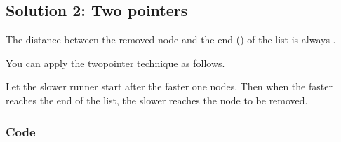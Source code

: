 \documentclass[letterpaper,12pt,english]{book}
\begin{document}
\subsection{Solution 2: Two pointers}
\label{\detokenize{Two_Pointers/08_TP_19_Remove_Nth_Node_From_End_of_List:solution-2-two-pointers}}
\sphinxAtStartPar
The distance between the removed node and the end () of the list is always .

\sphinxAtStartPar
You can apply the two\sphinxhyphen{}pointer technique as follows.

\sphinxAtStartPar
Let the slower runner start after the faster one  nodes. Then when the faster reaches the end of the list, the slower reaches the node to be removed.


\subsubsection{Code}
\label{\detokenize{Two_Pointers/08_TP_19_Remove_Nth_Node_From_End_of_List:id1}}
\end{document}
